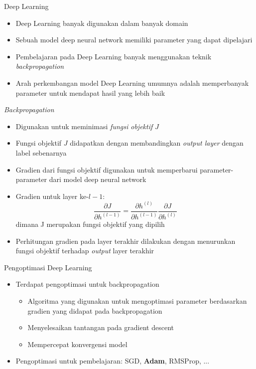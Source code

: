 \begin{frame}{Deep Learning}
  \begin{center}
    
  \end{center}
  \begin{itemize}
    \item Deep Learning banyak digunakan dalam banyak domain
    \item Sebuah model deep neural network memiliki parameter yang dapat dipelajari
    \item Pembelajaran pada Deep Learning banyak menggunakan teknik \textit{backpropagation}
    \item Arah perkembangan model Deep Learning umumnya adalah memperbanyak parameter untuk mendapat hasil yang lebih baik
  \end{itemize}
\end{frame}

\begin{frame}{\textit{Backpropagation}}
  \begin{itemize}
    \item Digunakan untuk meminimasi \textit{fungsi objektif} $J$
    \item Fungsi objektif $J$ didapatkan dengan membandingkan \textit{output layer} dengan label sebenarnya
    \item Gradien dari fungsi objektif digunakan untuk memperbarui parameter-parameter dari model deep neural network
    \item Gradien untuk layer ke-$l-1$: $$\frac{\partial J}{\partial h^{(l-1)}} = \frac{\partial h^{(l)}}{\partial h^{(l-1)}} \frac{\partial J}{\partial h^{(l)}}$$ dimana J merupakan fungsi objektif yang dipilih
    \item Perhitungan gradien pada layer terakhir dilakukan dengan menurunkan fungsi objektif terhadap \textit{output} layer terakhir
  \end{itemize}
\end{frame}

\begin{frame}{Pengoptimasi Deep Learning}
  \begin{itemize}
    \item Terdapat pengoptimasi untuk backpropagation
          \begin{itemize}
            \item Algoritma yang digunakan untuk mengoptimasi parameter berdasarkan gradien yang didapat pada backpropagation
            \item Menyelesaikan tantangan pada gradient descent
            \item Mempercepat konvergensi model
          \end{itemize}
    \item Pengoptimasi untuk pembelajaran: SGD, \textbf{Adam}, RMSProp, ...
  \end{itemize}
\end{frame}
